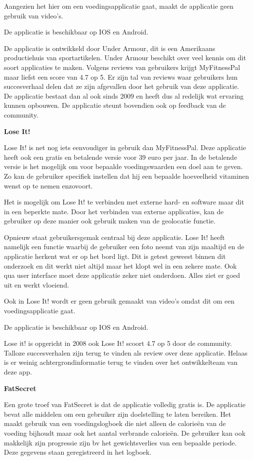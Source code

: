 Aangezien het hier om een voedingsapplicatie gaat, maakt de applicatie geen gebruik van video’s.

De applicatie is beschikbaar op IOS en Android.

De applicatie is ontwikkeld door Under Armour, dit is een Amerikaans productiehuis van sportartikelen. Under Armour beschikt over veel kennis om dit soort applicaties te maken. Volgens reviews van gebruikers krijgt MyFitnessPal maar liefst een score van 4.7 op 5. Er zijn tal van reviews waar gebruikers hun succesverhaal delen dat ze zijn afgevallen door het gebruik van deze applicatie. De applicatie bestaat dan al ook sinds 2009 en heeft dus al redelijk wat ervaring kunnen opbouwen. De applicatie steunt bovendien ook op feedback van de community. 

\textbf{Lose It!}

Lose It! is net nog iets eenvoudiger in gebruik dan MyFitnessPal. Deze applicatie heeft ook een gratis en betalende versie voor 39 euro per jaar. In de betalende versie is het mogelijk om voor bepaalde voedingswaarden een doel aan te geven. Zo kan de gebruiker specifiek instellen dat hij een bepaalde hoeveelheid vitaminen wenst op te nemen enzovoort. 

Het is mogelijk om Lose It! te verbinden met externe hard- en software maar dit in een beperkte mate. Door het verbinden van externe applicaties, kan de gebruiker op deze manier ook gebruik maken van de geolocatie functie. 

\newpage
Opnieuw staat gebruikersgemak centraal bij deze applicatie. Lose It! heeft namelijk een functie waarbij de gebruiker een foto neemt van zijn maaltijd en de applicatie herkent wat er op het bord ligt. Dit is getest geweest binnen dit onderzoek en dit werkt niet altijd maar het klopt wel in een zekere mate. Ook qua user interface moet deze applicatie zeker niet onderdoen. Alles ziet er goed uit en werkt vloeiend. 

Ook in Lose It! wordt er geen gebruik gemaakt van video’s omdat dit om een voedingsapplicatie gaat. 

De applicatie is beschikbaar op IOS en Android.

Lose it! is opgericht in 2008 ook Lose It! scoort 4.7 op 5 door de community. Talloze succesverhalen zijn terug te vinden als review over deze applicatie. Helaas is er weinig achtergrondinformatie terug te vinden over het ontwikkelteam van deze app.

\textbf{FatSecret}

Een grote troef van FatSecret is dat de applicatie volledig gratis is. De applicatie bevat alle middelen om een gebruiker zijn doelstelling te laten bereiken. Het maakt gebruik van een voedingslogboek die niet alleen de calorieën van de voeding bijhoudt maar ook het aantal verbrande calorieën. De gebruiker kan ook makkelijk zijn progressie zijn bv het gewichtsverlies van een bepaalde periode. Deze gegevens staan geregistreerd in het logboek. 

